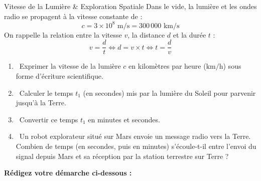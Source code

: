 \begin{sujetdnb}{Vitesse de la Lumière \& Exploration Spatiale}
Dans le vide, la lumière et les ondes radio se propagent à la vitesse constante de :
\[ c = 3 \times 10^8\text{ m/s} = 300\,000\text{ km/s} \]
On rappelle la relation entre la vitesse $v$, la distance $d$ et la durée $t$ :
\[ v = \frac{d}{t} \iff d = v \times t \iff t = \frac{d}{v} \]

\begin{center}
\end{center}

\begin{enumerate}
    \item \capSApproprier\ Exprimer la vitesse de la lumière $c$ en kilomètres par heure ($\text{km/h}$) sous forme d'écriture scientifique.
    \item \capRealiser\ Calculer le temps $t_1$ (en secondes) mis par la lumière du Soleil pour parvenir jusqu'à la Terre.
    \item \capRealiser\ Convertir ce temps $t_1$ en minutes et secondes.
    \item \capAnalyser\ Un robot explorateur situé sur Mars envoie un message radio vers la Terre.\\
    Combien de temps (en secondes, puis en minutes) s'écoule-t-il entre l'envoi du signal depuis Mars et sa réception par la station terrestre sur Terre ?
\end{enumerate}

\vspace{2mm}
\noindent\textbf{Rédigez votre démarche ci-dessous :}
\lignesreponse[10]
\end{sujetdnb}
